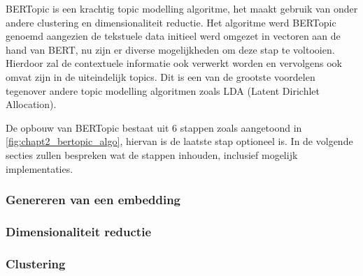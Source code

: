 BERTopic is een krachtig topic modelling algoritme, het maakt gebruik van onder andere clustering en dimensionaliteit reductie. Het algoritme werd BERTopic genoemd aangezien de tekstuele data initieel werd omgezet in vectoren aan de hand van BERT, nu zijn er diverse mogelijkheden om deze stap te voltooien. Hierdoor zal de contextuele informatie ook verwerkt worden en vervolgens ook omvat zijn in de uiteindelijk topics. Dit is een van de grootste voordelen tegenover andere topic modelling algoritmen zoals LDA (Latent Dirichlet Allocation).


De opbouw van BERTopic bestaat uit 6 stappen zoals aangetoond in \autoref{fig:chapt2_bertopic_algo}, hiervan is de laatste stap optioneel is. In de volgende secties zullen bespreken wat de stappen inhouden, inclusief mogelijk implementaties.

\subsubsection{Genereren van een embedding}

\subsubsection{Dimensionaliteit reductie}

\subsubsection{Clustering}


